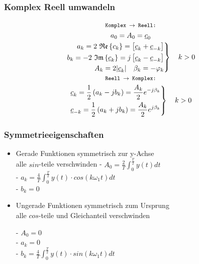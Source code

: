 \subsubsection{Komplex Reell umwandeln}
\begin{mdframed}[style=exercise]
	\begin{gather*}
		\texttt{\footnotesize Komplex $\rightarrow$ Reell:}\\
		a_0 = A_0 = \underline{c}_0\\
		\left.
		\begin{split}
			a_k = 2\ \mathfrak{Re}\left\{ c_k \right\}= \left[ \underline{c}_k+\underline{c}_{-k} \right]\\
			b_k = -2\ \mathfrak{Im}\left\{ \underline{c}_k \right\}= j\left[ \underline{c}_k-\underline{c}_{-k} \right]\\
			A_k = 2|\underline{c}_k| \quad \beta_k = -\varphi_k
		\end{split}\right\} \quad k>0\\
		\texttt{\footnotesize Reell $\rightarrow$ Komplex:}\\
		\left.
		\begin{split}
			\underline{c}_k = \frac{1}{2}\left( a_k-jb_k \right) = \frac{A_k}{2} e^{-j\beta_k}\\
			\underline{c}_{-k} = \frac{1}{2}\left( a_k+jb_k \right) = \frac{A_k}{2} e^{j\beta_k}
		\end{split}\right\} \quad k>0\\
	\end{gather*}
\end{mdframed}

\subsubsection{Symmetrieeigenschaften}
\begin{itemize}
	\item Gerade Funktionen
	      symmetrisch zur y-Achse\\
	      alle $sin$-teile verschwinden
	      - $A_0 = \frac{2}{T}\int^{\frac{T}{2}}_{0} y(t)dt$\\
	      - $a_{k} = \frac{4}{T}\int^{\frac{T}{2}}_{0}y(t)\cdot cos(k\omega_1t)dt$\\
	      - $b_k = 0$\\
	\item Ungerade Funktionen
	      symmetrisch zum Ursprung\\
	      alle $cos$-teile und Gleichanteil verschwinden

	      - $A_0 = 0$\\
	      - $a_k = 0$\\
	      - $b_{k} = \frac{4}{T}\int^{\frac{T}{2}}_{0} y(t)\cdot sin(k\omega_1t)dt$\\
\end{itemize}

